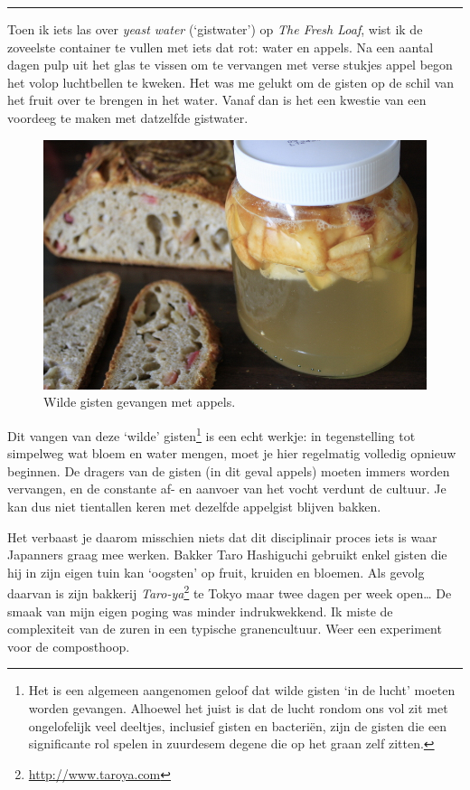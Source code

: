 \documentclass[
  11pt,
  dutch,
]{memoir}
\begin{document}
\pfbreak

Toen ik iets las over \emph{yeast water} (`gistwater') op \emph{The
Fresh Loaf}, wist ik de zoveelste container te vullen met iets dat rot:
water en appels. Na een aantal dagen pulp uit het glas te vissen om te
vervangen met verse stukjes appel begon het volop luchtbellen te kweken.
Het was me gelukt om de gisten op de schil van het fruit over te brengen
in het water. Vanaf dan is het een kwestie van een voordeeg te maken met
datzelfde gistwater.

\begin{figure}
    \centering
    \includegraphics{img/bw/appelgist.jpg}
    \caption{Wilde gisten gevangen met appels.}
\end{figure}

Dit vangen van deze `wilde' gisten\footnote{Het is een algemeen
  aangenomen geloof dat wilde gisten `in de lucht' moeten worden
  gevangen. Alhoewel het juist is dat de lucht rondom ons vol zit met
  ongelofelijk veel deeltjes, inclusief gisten en bacteriën, zijn de
  gisten die een significante rol spelen in zuurdesem degene die op het
  graan zelf zitten.} is een echt werkje: in tegenstelling tot simpelweg
wat bloem en water mengen, moet je hier regelmatig volledig opnieuw
beginnen. De dragers van de gisten (in dit geval appels) moeten immers
worden vervangen, en de constante af- en aanvoer van het vocht verdunt
de cultuur. Je kan dus niet tientallen keren met dezelfde appelgist
blijven bakken.

Het verbaast je daarom misschien niets dat dit disciplinair proces iets
is waar Japanners graag mee werken. Bakker Taro Hashiguchi gebruikt
enkel gisten die hij in zijn eigen tuin kan `oogsten' op fruit, kruiden
en bloemen. Als gevolg daarvan is zijn bakkerij
\emph{Taro-ya}\footnote{\url{http://www.taroya.com}} te Tokyo maar twee
dagen per week open\ldots{} De smaak van mijn eigen poging was minder
indrukwekkend. Ik miste de complexiteit van de zuren in een typische
granencultuur. Weer een experiment voor de composthoop.
\end{document}
